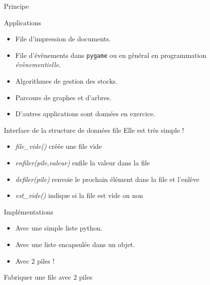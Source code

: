 \documentclass[10pt]{beamer}
\begin{document}
\begin{frame}{Principe}
\end{frame}
\begin{frame}{Applications}
	\begin{itemize}
		\item 	File d'impression de documents.
		\item 	File d'évènements dans \texttt{pygame} ou en général en programmation \textit{évènementielle}.
		\item	Algorithmes de gestion des stocks.
		\item 	Parcours de graphes et d'arbres.
		\item 	D'autres applications sont données en exercice.
	\end{itemize}
\end{frame}
\begin{frame}{Interface de la structure de données file}
	Elle est très simple !
	\begin{itemize}
		\item \textit{file\_vide()} créée une file vide
		\item \textit{enfiler(pile,valeur)} enfile la valeur dans la file
		\item  \textit{defiler(pile)} renvoie le prochain élément dans la file et l'enlève
		\item \textit{est\_vide()} indique si la file est vide on non	 
	\end{itemize}
\end{frame}
\begin{frame}{Implémentations}
	\begin{itemize}
		\item Avec une simple liste python.
		\item Avec une liste encapsulée dans un objet.
		\item Avec 2 piles !
	\end{itemize}
\end{frame}
\begin{frame}{Fabriquer une file avec 2 piles}
    \begin{center}
    \end{center}
\end{frame}
\end{document}
